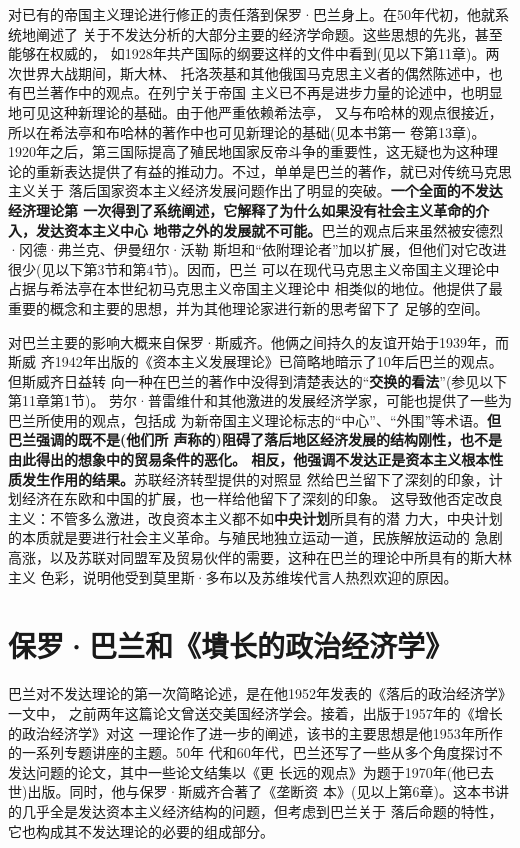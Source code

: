 对已有的帝国主义理论进行修正的责任落到保罗·巴兰身上。在50年代初，他就系统地阐述了
关于不发达分析的大部分主要的经济学命题。这些思想的先兆，甚至能够在权威的，
如1928年共产国际的纲要这样的文件中看到(见以下第11章)。两次世界大战期间，斯大林、
托洛茨基和其他俄国马克思主义者的偶然陈述中，也有巴兰著作中的观点。在列宁关于帝国
主义已不再是进步力量的论述中，也明显地可见这种新理论的基础。由于他严重依赖希法亭，
又与布哈林的观点很接近，所以在希法亭和布哈林的著作中也可见新理论的基础(见本书第一
卷第13章)。1920年之后，第三国际提高了殖民地国家反帝斗争的重要性，这无疑也为这种理
论的重新表达提供了有益的推动力。不过，单单是巴兰的著作，就已对传统马克思主义关于
落后国家资本主义经济发展问题作出了明显的突破。\textbf{一个全面的不发达经济理论第
  一次得到了系统阐述，它解释了为什么如果没有社会主义革命的介入，发达资本主义中心
  地带之外的发展就不可能。}巴兰的观点后来虽然被安德烈·冈德·弗兰克、伊曼纽尔·沃勒
斯坦和“依附理论者”加以扩展，但他们对它改进很少(见以下第3节和第4节)。因而，巴兰
可以在现代马克思主义帝国主义理论中占据与希法亭在本世纪初马克思主义帝国主义理论中
相类似的地位。他提供了最重要的概念和主要的思想，并为其他理论家进行新的思考留下了
足够的空间。

对巴兰主要的影响大概来自保罗·斯威齐。他俩之间持久的友谊开始于1939年，而斯威
齐1942年出版的《资本主义发展理论》已简略地暗示了10年后巴兰的观点。但斯威齐日益转
向一种在巴兰的著作中没得到清楚表达的“\textbf{交换的看法}”(参见以下第11章第1节)。
劳尔·普雷维什和其他激进的发展经济学家，可能也提供了一些为巴兰所使用的观点，包括成
为新帝国主义理论标志的“中心”、“外围”等术语。\textbf{但巴兰强调的既不是(他们所
  声称的)阻碍了落后地区经济发展的结构刚性，也不是由此得出的想象中的贸易条件的恶化。
  相反，他强调不发达正是资本主义根本性质发生作用的结果。}苏联经济转型提供的对照显
然给巴兰留下了深刻的印象，计划经济在东欧和中国的扩展，也一样给他留下了深刻的印象。
这导致他否定改良主义：不管多么激进，改良资本主义都不如\textbf{中央计划}所具有的潜
力大，中央计划的本质就是要进行社会主义革命。与殖民地独立运动一道，民族解放运动的
急剧高涨，以及苏联对同盟军及贸易伙伴的需要，这种在巴兰的理论中所具有的斯大林主义
色彩，说明他受到莫里斯·多布以及苏维埃代言人热烈欢迎的原因。

\section{保罗·巴兰和《墤长的政治经济学》}

巴兰对不发达理论的第一次简略论述，是在他1952年发表的《落后的政治经济学》一文中，
之前两年这篇论文曾送交美国经济学会。接着，出版于1957年的《增长的政治经济学》对这
一理论作了进一步的阐述，该书的主要思想是他1953年所作的一系列专题讲座的主题。50年
代和60年代，巴兰还写了一些从多个角度探讨不发达问题的论文，其中一些论文结集以《更
长远的观点》为题于1970年(他已去世)出版。同时，他与保罗·斯威齐合著了《垄断资
本》(见以上第6章)。这本书讲的几乎全是发达资本主义经济结构的问题，但考虑到巴兰关于
落后命题的特性，它也构成其不发达理论的必要的组成部分。

